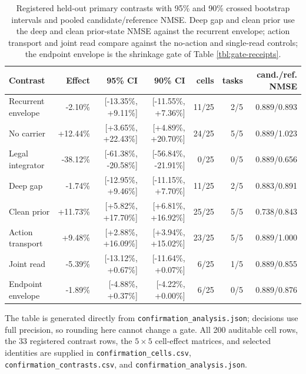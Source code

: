 \begin{table}[H]
\centering
\caption{Registered held-out primary contrasts with 95\% and 90\% crossed bootstrap intervals and pooled candidate/reference NMSE. Deep gap and clean prior use the deep and clean prior-state NMSE against the recurrent envelope; action transport and joint read compare against the no-action and single-read controls; the endpoint envelope is the shrinkage gate of Table \ref{tbl:gate-receipts}.}
\label{tbl:contrast-full}
\footnotesize
\setlength{\tabcolsep}{3.4pt}
\begin{tabular}{@{}lrrrrrr@{}}
\toprule
\textcolor{NVIDIADark}{\textbf{Contrast}} & \textcolor{NVIDIADark}{\textbf{Effect}} & \textcolor{NVIDIADark}{\textbf{95\% CI}} & \textcolor{NVIDIADark}{\textbf{90\% CI}} & \textcolor{NVIDIADark}{\textbf{cells}} & \textcolor{NVIDIADark}{\textbf{tasks}} & \textcolor{NVIDIADark}{\textbf{cand./ref. NMSE}} \\
\midrule
Recurrent envelope & -2.10\% & [-13.35\%, +9.11\%] & [-11.55\%, +7.36\%] & 11/25 & 2/5 & 0.889/0.893 \\
No carrier & +12.44\% & [+3.65\%, +22.43\%] & [+4.89\%, +20.70\%] & 24/25 & 5/5 & 0.889/1.023 \\
Legal integrator & -38.12\% & [-61.38\%, -20.58\%] & [-56.84\%, -21.91\%] & 0/25 & 0/5 & 0.889/0.656 \\
Deep gap & -1.74\% & [-12.95\%, +9.46\%] & [-11.15\%, +7.70\%] & 11/25 & 2/5 & 0.883/0.891 \\
Clean prior & +11.73\% & [+5.82\%, +17.70\%] & [+6.81\%, +16.92\%] & 25/25 & 5/5 & 0.738/0.843 \\
Action transport & +9.48\% & [+2.88\%, +16.09\%] & [+3.94\%, +15.02\%] & 23/25 & 5/5 & 0.889/1.000 \\
Joint read & -5.39\% & [-13.12\%, +0.67\%] & [-11.64\%, +0.07\%] & 6/25 & 1/5 & 0.889/0.855 \\
Endpoint envelope & -1.89\% & [-4.88\%, +0.37\%] & [-4.22\%, +0.00\%] & 6/25 & 0/5 & 0.889/0.876 \\
\bottomrule
\end{tabular}
\end{table}

The table is generated directly from
\texttt{confirmation\_analysis.json}; decisions use full precision, so
rounding here cannot change a gate. All 200 auditable cell rows, the 33
registered contrast rows, the \(5\times5\) cell-effect matrices, and
selected identities are supplied in \texttt{confirmation\_cells.csv},
\texttt{confirmation\_contrasts.csv}, and
\texttt{confirmation\_analysis.json}.

